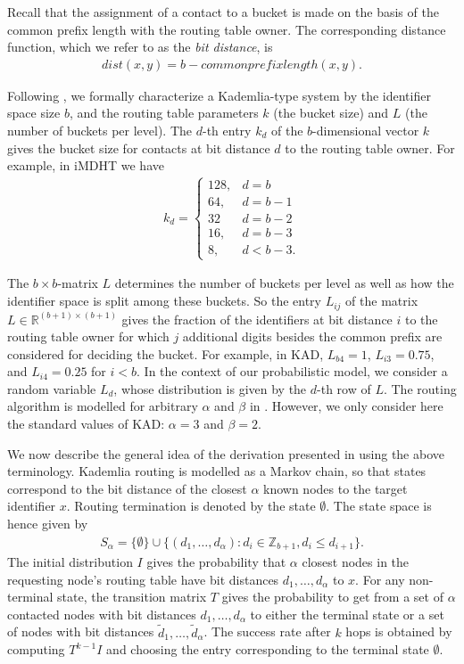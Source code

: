 \documentclass[10pt, conference, compsocconf, letterpaper]{IEEEtran}
\newcommand{\found}{\emptyset}
\begin{document}
Recall that the assignment of a contact to a bucket is made on the basis of the common prefix length with the routing table owner. The corresponding distance function, which we refer to as the \emph{bit distance}, is\begin{align}dist(x,y) = b - commonprefixlength(x,y).\end{align}

Following \cite{roos13comprehending}, we formally characterize a Kademlia-type system by the identifier space size $b$,  and the routing table parameters $k$ (the bucket size) and $L$ (the number of buckets per level).
The $d$-th entry $k_d$ of the $b$-dimensional vector $k$ gives the bucket size for contacts at bit distance $d$ to the routing table owner. For example, in iMDHT we have
\begin{align*}
k_d = \begin{cases}
128, & d=b \\
64, &  d=b-1 \\
32 & d=b-2 \\
16, & d=b-3 \\
8, & d < b-3.
\end{cases}
\end{align*}

The $b\times b$-matrix $L$ determines the number of buckets per level as well as how the identifier space is split among these buckets.
So the entry $L_{ij}$ of the matrix $L \in \mathbb{R}^{(b+1) \times (b+1)}$ gives the fraction of the identifiers 
at bit distance $i$ to the routing table owner for which $j$ additional digits besides the common prefix
are considered for deciding the bucket.
For example, in KAD,
$L_{b4}=1$, $L_{i3} = 0.75$, and $L_{i4} = 0.25$
for $i < b$. In the context of our probabilistic model, we consider a random variable $L_d$, whose distribution
is given by the $d$-th row of $L$.
The routing algorithm is modelled for arbitrary $\alpha$ and $\beta$ in \cite{roos13comprehending}. However, we only consider here the standard values of KAD: $\alpha=3$ and $\beta=2$.

We now describe the general idea of the derivation presented in \cite{roos13comprehending} using the above terminology.
Kademlia routing is modelled as a Markov chain, so that states correspond to the bit distance of the closest
$\alpha$ known nodes to the target identifier $x$.
Routing termination is denoted by the state $\found$. 
The state space is hence given by
\begin{align*}
S_\alpha = \{\found\} \cup \{(d_1, \ldots, d_\alpha): d_i \in \mathbb{Z}_{b+1}, d_i \leq d_{i+1}\}. \end{align*} The initial distribution $I$ gives the probability that $\alpha$ closest nodes in the requesting node's routing table have bit distances $d_1, \ldots ,d_\alpha$ to $x$.  
For any non-terminal state, the transition matrix $T$ gives the probability to get from a set of $\alpha$ contacted nodes with bit distances $d_1, \ldots ,d_\alpha$ to 
either the terminal state or a set of nodes with bit distances
 $\tilde{d}_1, \ldots ,\tilde{d}_\alpha$. 
The success rate after $k$ hops is obtained by computing 
 $T^{k-1}I$ and choosing the entry corresponding to the terminal state $\found$.
 
\end{document}
